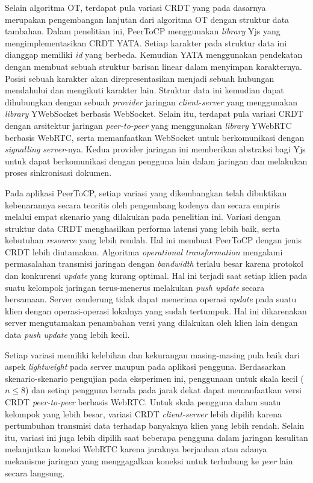 Selain algoritma OT, terdapat pula variasi CRDT yang pada dasarnya merupakan pengembangan lanjutan dari algoritma OT dengan struktur data tambahan. Dalam penelitian ini, PeerToCP menggunakan \textit{library} Yjs yang mengimplementasikan CRDT YATA. Setiap karakter pada struktur data ini dianggap memiliki \textit{id} yang berbeda. Kemudian YATA menggunakan pendekatan dengan membuat sebuah struktur barisan linear dalam menyimpan karakternya. Posisi sebuah karakter akan direpresentasikan menjadi sebuah hubungan mendahului dan mengikuti karakter lain. Struktur data ini kemudian dapat dihubungkan dengan sebuah \textit{provider} jaringan \textit{client-server} yang menggunakan \textit{library} YWebSocket berbasis WebSocket. Selain itu, terdapat pula variasi CRDT dengan arsitektur jaringan \textit{peer-to-peer} yang menggunakan \textit{library} YWebRTC berbasis WebRTC, serta memanfaatkan WebSocket untuk berkomunikasi dengan \textit{signalling server}-nya. Kedua provider jaringan ini memberikan abstraksi bagi Yjs untuk dapat berkomunikasi dengan pengguna lain dalam jaringan dan melakukan proses sinkronisasi dokumen.

Pada aplikasi PeerToCP, setiap variasi yang dikembangkan telah dibuktikan kebenarannya secara teoritis oleh pengembang kodenya dan secara empiris melalui empat skenario yang dilakukan pada penelitian ini. Variasi dengan struktur data CRDT menghasilkan performa latensi yang lebih baik, serta kebutuhan \textit{resource} yang lebih rendah. Hal ini membuat PeerToCP dengan jenis CRDT lebih diutamakan. Algoritma \textit{operational transformation} mengalami permasalahan transmisi jaringan dengan \textit{bandwidth} terlalu besar karena protokol dan konkurensi \textit{update} yang kurang optimal. Hal ini terjadi saat setiap klien pada suatu kelompok jaringan terus-menerus melakukan \textit{push update} secara bersamaan. Server cenderung tidak dapat menerima operasi \textit{update} pada suatu klien dengan operasi-operasi lokalnya yang sudah tertumpuk. Hal ini dikarenakan server mengutamakan penambahan versi yang dilakukan oleh klien lain dengan data \textit{push update} yang lebih kecil.

Setiap variasi memiliki kelebihan dan kekurangan masing-masing pula baik dari aspek \textit{lightweight} pada server maupun pada aplikasi pengguna. Berdasarkan skenario-skenario pengujian pada eksperimen ini, penggunaan untuk skala kecil ($n \leq 8$) dan setiap pengguna berada pada jarak dekat dapat memanfaatkan versi CRDT \textit{peer-to-peer} berbasis WebRTC. Untuk skala pengguna dalam suatu kelompok yang lebih besar, variasi CRDT \textit{client-server} lebih dipilih karena pertumbuhan transmisi data terhadap banyaknya klien yang lebih rendah. Selain itu, variasi ini juga lebih dipilih saat beberapa pengguna dalam jaringan kesulitan melanjutkan koneksi WebRTC karena jaraknya berjauhan atau adanya mekanisme jaringan yang menggagalkan koneksi untuk terhubung ke \textit{peer} lain secara langsung.

